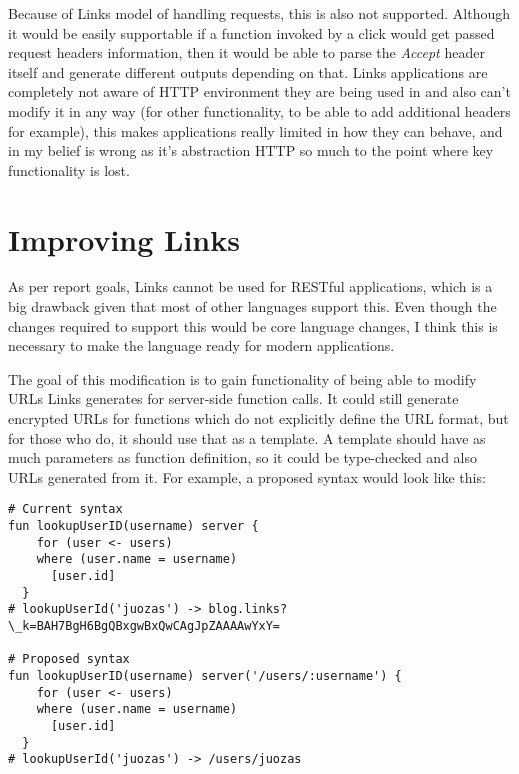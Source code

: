 Because of Links model of handling requests, this is also not supported. Although it would be easily supportable if a function invoked by a click would get passed request headers information, then it would be able to parse the \textit{Accept} header itself and generate different outputs depending on that. Links applications are completely not aware of HTTP environment they are being used in and also can't modify it in any way (for other functionality, to be able to add additional headers for example), this makes applications really limited in how they can behave, and in my belief is wrong as it's abstraction HTTP so much to the point where key functionality is lost. 

\section{Improving Links}

As per report goals, Links cannot be used for RESTful applications, which is a big drawback given that most of other languages support this. Even though the changes required to support this would be core language changes, I think this is necessary to make the language ready for modern applications. 

The goal of this modification is to gain functionality of being able to modify URLs Links generates for server-side function calls. It could still generate encrypted URLs for functions which do not explicitly define the URL format, but for those who do, it should use that as a template. A template should have as much parameters as function definition, so it could be type-checked and also URLs generated from it. For example, a proposed syntax would look like this:

\begin{codelisting}
\begin{verbatim}
# Current syntax
fun lookupUserID(username) server {
    for (user <- users)
    where (user.name = username)
      [user.id]
  }
# lookupUserId('juozas') -> blog.links?\_k=BAH7BgH6BgQBxgwBxQwCAgJpZAAAAwYxY=

# Proposed syntax
fun lookupUserID(username) server('/users/:username') {
    for (user <- users)
    where (user.name = username)
      [user.id]
  }
# lookupUserId('juozas') -> /users/juozas
\end{verbatim}
\end{codelisting}
